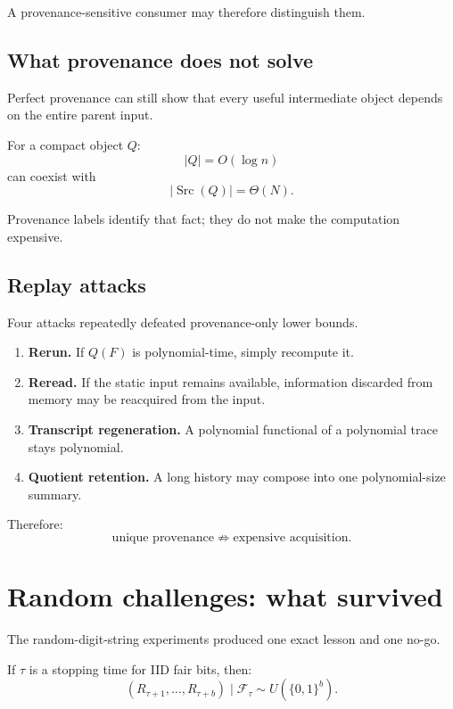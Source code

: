 \documentclass[11pt]{article}
\theoremstyle{plain}
\theoremstyle{definition}
\theoremstyle{remark}
\begin{document}
A provenance-sensitive consumer may therefore distinguish them.

\subsection{What provenance does not solve}

Perfect provenance can still show that every useful intermediate object depends
on the entire parent input.

For a compact object \(Q\):
\[
|Q|=O(\log n)
\]
can coexist with
\[
|\operatorname{Src}(Q)|=\Theta(N).
\]

Provenance labels identify that fact; they do not make the computation
expensive.

\subsection{Replay attacks}

Four attacks repeatedly defeated provenance-only lower bounds.

\begin{enumerate}[leftmargin=1.6em]
\item \textbf{Rerun.}
If \(Q(F)\) is polynomial-time, simply recompute it.

\item \textbf{Reread.}
If the static input remains available, information discarded from memory may
be reacquired from the input.

\item \textbf{Transcript regeneration.}
A polynomial functional of a polynomial trace stays polynomial.

\item \textbf{Quotient retention.}
A long history may compose into one polynomial-size summary.
\end{enumerate}

Therefore:
\[
\boxed{
\text{unique provenance}
\not\Rightarrow
\text{expensive acquisition}.
}
\]

\section{Random challenges: what survived}

The random-digit-string experiments produced one exact lesson and one no-go.

If \(\tau\) is a stopping time for IID fair bits, then:
\[
(R_{\tau+1},\ldots,R_{\tau+b})
\mid
\mathcal F_\tau
\sim
U(\{0,1\}^b).
\]
\end{document}
